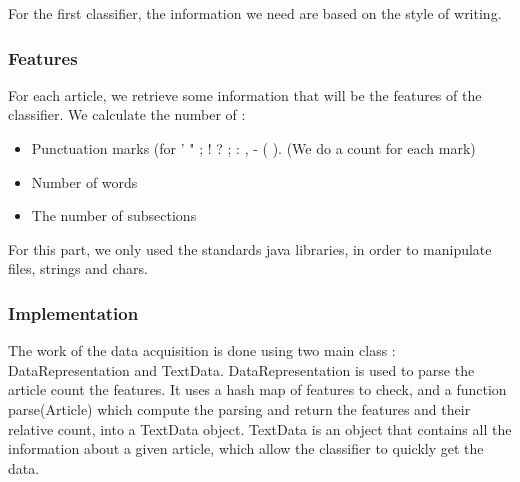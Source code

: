 For the first classifier, the information we need are based on the style of writing.

\subsubsection{Features}

For each article, we retrieve some information that will be the features of the classifier. We calculate the number of : 
\begin{itemize}
	\item Punctuation marks (for ' " ; ! ? ; : , - ( ). (We do a count for each mark)
	\item Number of words
	\item The number of subsections
\end{itemize}

For this part, we only used the standards java libraries, in order to manipulate files, strings and chars. 

\subsubsection{Implementation}

The work of the data acquisition is done using two main class : DataRepresentation and TextData.
DataRepresentation is used to parse the article count the features. It uses a hash map of features to check, and a function parse(Article) which compute the parsing and return the features and their relative count, into a TextData object.
TextData is an object that contains all the information about a given article, which allow the classifier to quickly get the data. 
